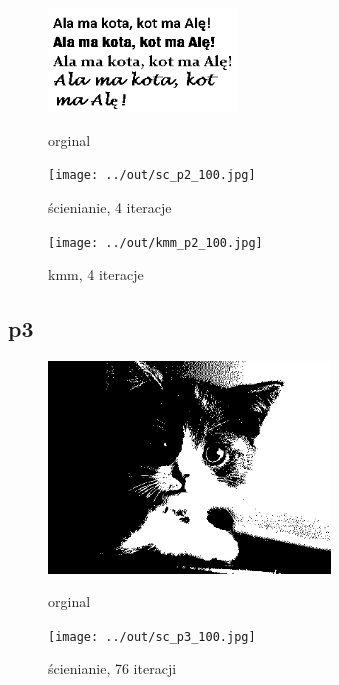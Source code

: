 \documentclass[a4paper,12pt]{article}
\begin{document}
\begin{figure}[h!]
\begin{minipage}[t]{5cm}
\begin{center}
\includegraphics[width=5cm]{../in/p2.jpg}
\caption{orginal}
\end{center}
\end{minipage}
\hfill
\begin{minipage}[t]{5cm}
\begin{center}
\texttt{[image: ../out/sc\_p2\_100.jpg]}
\caption{ścienianie, 4 iteracje}
\end{center}
\end{minipage}
\hfill
\begin{minipage}[t]{5cm}
\begin{center}
\texttt{[image: ../out/kmm\_p2\_100.jpg]}
\caption{kmm, 4 iteracje}
\end{center}
\end{minipage}
\end{figure}



\newpage
\subsection{p3}

\begin{figure}[h!]
\begin{minipage}[t]{7.5cm}
\begin{center}
\includegraphics[width=7.5cm]{../in/p3.jpg}
\caption{orginal}
\end{center}
\end{minipage}
\hfill
\begin{minipage}[t]{7.5cm}
\begin{center}
\texttt{[image: ../out/sc\_p3\_100.jpg]}
\caption{ścienianie, 76 iteracji}
\end{center}
\end{minipage}
\end{figure}
\end{document}
